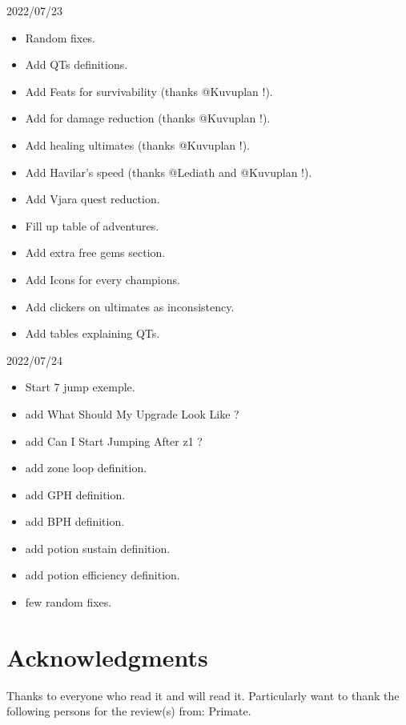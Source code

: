\documentclass{article}
\begin{document}
2022/07/23
\begin{itemize}
    \item Random fixes.
    \item Add QTs definitions.
    \item Add Feats for survivability (thanks @Kuvuplan !).
    \item Add \selise for damage reduction (thanks @Kuvuplan !).
    \item Add healing ultimates (thanks @Kuvuplan !).
    \item Add Havilar's speed (thanks @Lediath and @Kuvuplan !).
    \item Add Vjara quest reduction.
    \item Fill up table of adventures.
    \item Add extra free gems section.
    \item Add Icons for every champions.
    \item Add clickers on ultimates as inconsistency.
    \item Add tables explaining QTs.
\end{itemize}


2022/07/24
\begin{itemize}
    \item Start 7 jump exemple.
    \item add What Should My Upgrade Look Like ?
    \item add Can I Start Jumping After z1 ?
    \item add zone loop definition.
    \item add GPH definition.
    \item add BPH definition.
    \item add potion sustain definition.
    \item add potion efficiency definition.
    \item few random fixes.
\end{itemize}
    
\section{Acknowledgments}

Thanks to everyone who read it and will read it.
Particularly want to thank the following persons for the review(s) from: Primate.
\end{document}
